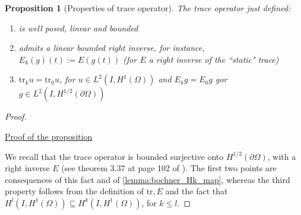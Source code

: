 \documentclass[english,a4paper,9pt,oneside]{scrbook}	%
\theoremstyle{break}
\newtheorem{prop}[equation]{Proposition}
\newenvironment{mproof}[1][\proofname]{%
  \begin{proof}[#1]$ $\par\nobreak\ignorespaces
}{%
  \end{proof}
}
\renewcommand*{\proofname}{Proof}
\theoremstyle{remark}
\newcommand{\tr}{\text{tr}}
\newcommand{\emb}{\hookrightarrow}
\begin{document}
\begin{appendices}
\begin{prop}[Properties of trace operator]
\label{prop:trace}
The trace operator just defined:
\begin{enumerate}
\item is well posed, linear and bounded
\item admits a linear bounded right inverse, for instance, $E_k(g)(t):=E(g(t))$ (for $E$ a right inverse of the ``static" trace)
\item $\tr_k u = \tr_0 u$, for $u \in L^2(I,H^1(\Omega))$ and $E_k g = E_0g$ gor $g \in L^2(I,H^{1/2}(\partial \Omega))$
\end{enumerate}
\end{prop}
\begin{mproof}

\underline{Proof of the proposition}

We recall that the trace operator is bounded surjective onto $H^{1/2}(\partial \Omega)$, with a right inverse $E$ (see theorem 3.37 at page 102 of \cite{mclean}). The first two points are consequences of this fact and of \cref{lemma:bochner_Hk_map}, whereas the third property follows from the definition of $\tr, E$ and the fact that $H^l(I,H^1(\Omega))\subseteq H^k(I,H^1(\Omega))$, for $k\leq l$.



\end{mproof}
\end{appendices}
\end{document}
